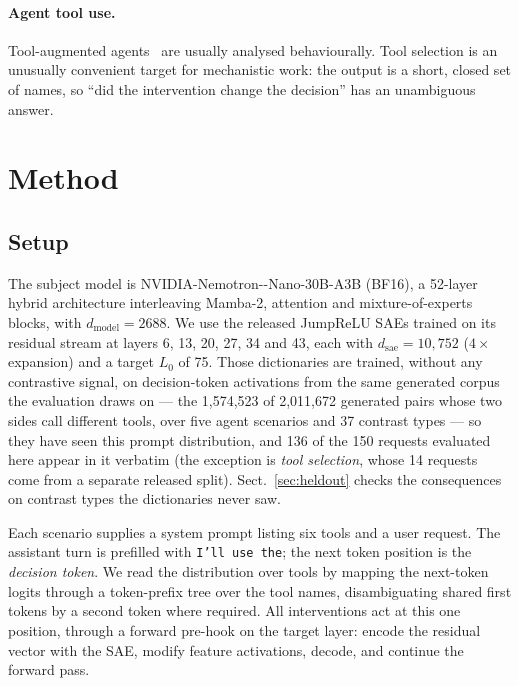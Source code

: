 \documentclass{article}
\begin{document}
\paragraph{Agent tool use.} Tool-augmented agents~\cite{schick2023toolformerlanguagemodelsteach,yao2023reactsynergizingreasoningacting} are usually analysed behaviourally. Tool selection is an unusually convenient target for mechanistic work: the output is a short, closed set of names, so ``did the intervention change the decision'' has an unambiguous answer.

\section{Method}
\label{sec:method}

\subsection{Setup}

The subject model is NVIDIA-\allowbreak Nemotron--\allowbreak Nano-\allowbreak 30B-\allowbreak A3B (BF16), a 52-layer hybrid architecture interleaving Mamba-2, attention and mixture-of-experts blocks, with $d_{\text{model}} = 2688$. We use the released JumpReLU SAEs trained on its residual stream at layers 6, 13, 20, 27, 34 and 43, each with $d_{\text{sae}} = 10{,}752$ ($4\times$ expansion) and a target $L_0$ of 75. Those dictionaries are trained, without any contrastive signal, on decision-token activations from the same generated corpus the evaluation draws on --- the 1{,}574{,}523 of 2{,}011{,}672 generated pairs whose two sides call different tools, over five agent scenarios and 37 contrast types --- so they have seen this prompt distribution, and 136 of the 150 requests evaluated here appear in it verbatim (the exception is \emph{tool selection}, whose 14 requests come from a separate released split). Sect.~\ref{sec:heldout} checks the consequences on contrast types the dictionaries never saw.

Each scenario supplies a system prompt listing six tools and a user request. The assistant turn is prefilled with \texttt{I'll use the}; the next token position is the \emph{decision token}. We read the distribution over tools by mapping the next-token logits through a token-prefix tree over the tool names, disambiguating shared first tokens by a second token where required. All interventions act at this one position, through a forward pre-hook on the target layer: encode the residual vector with the SAE, modify feature activations, decode, and continue the forward pass.
\end{document}

